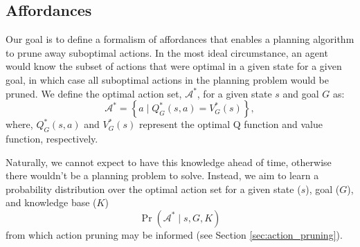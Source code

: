 \documentclass[conference]{IEEEtran}
\begin{document}


\subsection{Affordances}


Our goal is to define a formalism of affordances that enables a planning algorithm
to prune away suboptimal actions. In the most ideal circumstance, an agent would
know the subset of actions that were optimal in a given state for a given goal, in 
which case all suboptimal actions in the planning problem would be pruned. 
We define the optimal action set, $\mathcal{A}^*$, for a given state $s$ and goal $G$ as:
\begin{equation}
\mathcal{A}^* = \left\{ a \mid Q^*_G(s,a) = V^*_G(s) \right\}, 
\label{eq:opt_act_set}
\end{equation}
where, $Q^*_G(s,a)$ and $V^*_G(s)$ represent the optimal Q function and 
value function, respectively. 

Naturally, we cannot expect to have this knowledge ahead of time, otherwise there wouldn't be a planning problem to solve. Instead, we aim to learn a probability distribution over the optimal action set for a given state ($s$), goal ($G$), and knowledge base ($K$)
\begin{equation}
\Pr(\mathcal{A}^* \mid s, G, K)
\label{eq:master}
\end{equation}
from which action pruning may be informed (see Section \ref{sec:action_pruning}).
\end{document}
